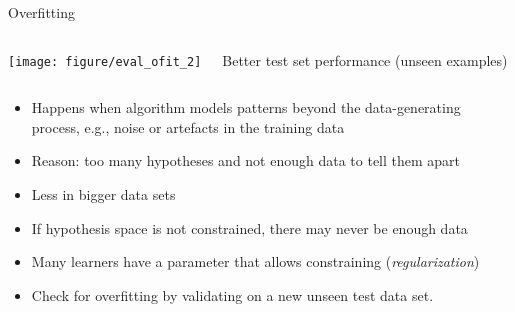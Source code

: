 \documentclass[11pt,compress,t,notes=noshow, xcolor=table]{beamer}
\newenvironment{knitrout}{}{} %
\begin{document}
\begin{vbframe}{Overfitting}
\begin{columns}[T,onlytextwidth]
\begin{knitrout}
{\centering \texttt{[image: figure/eval\_ofit\_2]} 

}



\end{knitrout}
Better test set performance (unseen examples)
\end{columns}


\framebreak


\begin{itemize}
  \item Happens when algorithm models patterns beyond the data-generating process,
    e.g., noise or artefacts in the training data
  \item Reason: too many hypotheses and not enough data to tell them apart
  \item Less in bigger data sets
  \item If hypothesis space is not constrained, there may never be enough data
  \item Many learners have a parameter that allows constraining (\textit{regularization})
  \item Check for overfitting by validating on a new unseen test data set.
\end{itemize}

\end{vbframe}


\end{document}
